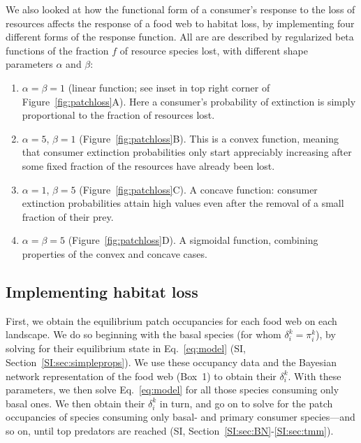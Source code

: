 \documentclass[11pt]{article}
\newcommand{\SI}{SI}
\begin{document}
We also looked at how the functional form of a consumer's response to the loss of resources affects the response of a food web to habitat loss, by implementing four different forms of the response function. All are are described by regularized beta functions of the fraction $f$ of resource species lost, with different shape parameters $\alpha$ and $\beta$:
\begin{enumerate}
\item $\alpha = \beta = 1$ (linear function; see inset in top right corner of Figure~\ref{fig:patchloss}A). Here a consumer's probability of extinction is simply proportional to the fraction of resources lost.
\item $\alpha=5$, $\beta=1$ (Figure~\ref{fig:patchloss}B). This is a convex function, meaning that consumer extinction probabilities only start appreciably increasing after some fixed fraction of the resources have already been lost.
\item $\alpha=1$, $\beta=5$ (Figure~\ref{fig:patchloss}C). A concave function: consumer extinction probabilities attain high values even after the removal of a small fraction of their prey.
\item $\alpha = \beta = 5$ (Figure~\ref{fig:patchloss}D). A sigmoidal function, combining properties of the convex and concave cases.
\end{enumerate}


\subsection{Implementing habitat loss}

First, we obtain the equilibrium patch occupancies for each food web on each landscape. We do so beginning with the basal species (for whom $\delta_i^k = \pi_i^k$), by solving for their equilibrium state in Eq.~\ref{eq:model} (\SI, Section~\ref{SI:sec:simpleprops}). We use these occupancy data and the Bayesian network representation of the food web (Box~1) to obtain their $\delta_i^k$. With these parameters, we then solve Eq.~\ref{eq:model} for all those species consuming only basal ones. We then obtain their $\delta_i^k$ in turn, and go on to solve for the patch occupancies of species consuming only basal- and primary consumer species---and so on, until top predators are reached (\SI, Section~\ref{SI:sec:BN}-\ref{SI:sec:tmm}).
\end{document}
